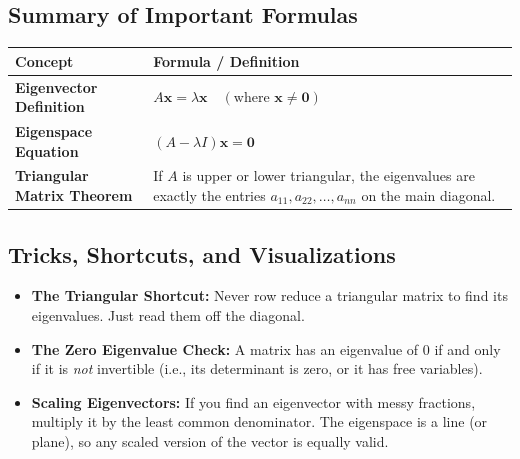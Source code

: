 \documentclass[11pt, a4paper]{article}
\theoremstyle{definition}
\theoremstyle{remark}
\begin{document}
\subsection{Summary of Important Formulas}
\renewcommand{\arraystretch}{1.5}
\noindent
\begin{tabularx}{\textwidth}{lX}
\toprule
\textbf{Concept} & \textbf{Formula / Definition} \\
\midrule
\textbf{Eigenvector Definition} & $\displaystyle A\mathbf{x} = \lambda \mathbf{x} \quad (\text{where } \mathbf{x} \neq \mathbf{0})$ \\
\textbf{Eigenspace Equation} & $\displaystyle (A - \lambda I)\mathbf{x} = \mathbf{0}$ \\
\textbf{Triangular Matrix Theorem} & If $A$ is upper or lower triangular, the eigenvalues are exactly the entries $a_{11}, a_{22}, \dots, a_{nn}$ on the main diagonal. \\
\bottomrule
\end{tabularx}

\subsection{Tricks, Shortcuts, and Visualizations}
\begin{itemize}
    \item \textbf{The Triangular Shortcut:} Never row reduce a triangular matrix to find its eigenvalues. Just read them off the diagonal.
    \item \textbf{The Zero Eigenvalue Check:} A matrix has an eigenvalue of $0$ if and only if it is \textit{not} invertible (i.e., its determinant is zero, or it has free variables).
    \item \textbf{Scaling Eigenvectors:} If you find an eigenvector with messy fractions, multiply it by the least common denominator. The eigenspace is a line (or plane), so any scaled version of the vector is equally valid.
\end{itemize}
\end{document}
